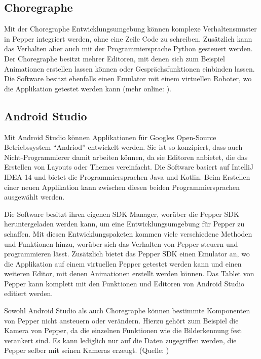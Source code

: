 \subsection{Choregraphe}

Mit der Choregraphe Entwicklungsumgebung können komplexe Verhaltensmuster in Pepper integriert werden, ohne eine Zeile Code zu schreiben.
Zusätzlich kann das Verhalten aber auch mit der Programmiersprache Python gesteuert werden. Der Choregraphe besitzt mehrer Editoren, mit denen sich zum Beispiel Animationen erstellen lassen können oder Gesprächsfunktionen einbinden lassen. Die Software besitzt ebenfalls einen Emulator mit einem virtuellen Roboter, wo die Applikation getestet werden kann (mehr online: \cite{Choregraphe}).\\

\subsection{Android Studio}

Mit Android Studio können Applikationen für Googles Open-Source Betriebssystem ``Andriod'' entwickelt werden. Sie ist so konzipiert, dass auch Nicht-Programmierer damit arbeiten können, da sie Editoren anbietet, die das Erstellen von Layouts oder Themes vereinfacht. Die Software basiert auf IntelliJ IDEA 14 und bietet die Programmiersprachen Java und Kotlin. Beim Erstellen einer neuen Applikation kann zwischen diesen beiden Programmiersprachen ausgewählt werden.

Die Software besitzt ihren eigenen SDK Manager, worüber die Pepper SDK heruntergeladen werden kann, um eine Entwicklungsumgebung für Pepper zu schaffen. Mit diesen Entwicklungspaketen kommen viele verschiedene Methoden und Funktionen hinzu, worüber sich das Verhalten von Pepper steuern und programmieren lässt. Zusätzlich bietet das Pepper SDK einen Emulator an, wo die Applikation auf einem virtuellen Pepper getestet werden kann und einen weiteren Editor, mit denen Animationen erstellt werden können. Das Tablet von Pepper kann komplett mit den Funktionen und Editoren von Android Studio editiert werden.

Sowohl Android Studio als auch Choregraphe können bestimmte Komponenten von Pepper nicht ansteuern oder verändern. Hierzu gehört zum Beispiel die Kamera von Pepper, da die einzelnen Funktionen wie die Bilderkennung fest verankert sind. Es kann lediglich nur auf die Daten zugegriffen werden, die Pepper selber mit seinen Kameras erzeugt.
(Quelle: \cite{Android_Studio})\\

